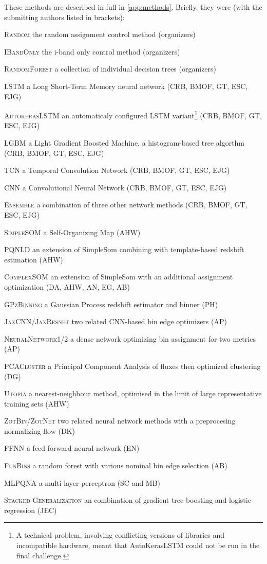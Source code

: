\documentclass[twocolumn,twocolappendix]{aastex63}
\begin{document}
These methods are described in full in \autoref{app:methods}.  Briefly, they were (with the submitting authors listed in brackets):
\begin{description*}
	\item[\textsc{Random}] the random assignment control method (organizers)
	\item[\textsc{IBandOnly}] the i-band only control method (organizers)
	\item[\textsc{RandomForest}] a collection of individual decision trees (organizers)
	\item[\textsc{LSTM}] a Long Short-Term Memory neural network (CRB, BMOF, GT, ESC, EJG)
	\item[\textsc{AutokerasLSTM}] an automaticaly configured LSTM variant\footnote{A technical problem, involving conflicting versions of libraries and incompatible hardware, meant that AutoKerasLSTM could not be run in the final challenge.} (CRB, BMOF, GT, ESC, EJG)
	\item[\textsc{LGBM}] a Light Gradient Boosted Machine, a histogram-based tree algorthm (CRB, BMOF, GT, ESC, EJG)
	\item[\textsc{TCN}] a Temporal Convolution Network (CRB, BMOF, GT, ESC, EJG)
	\item[\textsc{CNN}] a Convolutional Neural Network (CRB, BMOF, GT, ESC, EJG)
	\item[\textsc{Ensemble}] a combination of three other network methods (CRB, BMOF, GT, ESC, EJG)
	\item[\textsc{SimpleSOM}] a Self-Organizing Map (AHW)
	\item[\textsc{PQNLD}] an extension of {\sc SimpleSom} combining with template-based redshift estimation (AHW)
	\item[\textsc{ComplexSOM}] an extension of {\sc SimpleSom} with an additional assignment optimization (DA, AHW, AN, EG, AB)
	\item[\textsc{GPzBinning}] a Gaussian Process redshift estimator and binner (PH)
	\item[\textsc{JaxCNN/JaxResnet}] two related CNN-based bin edge optimizers (AP)
	\item[\textsc{NeuralNetwork1/2}] a dense network optimizing bin assignment for two metrics (AP)
	\item[\textsc{PCACluster}] a Principal Component Analysis of fluxes then optimized clustering (DG)
	\item[\textsc{Utopia}] a nearest-neighbour method, optimised in the limit of large representative training sets (AHW)
	\item[\textsc{ZotBin/ZotNet}] two related neural network methods with a preprocesing normalizing flow (DK)
	\item[\textsc{FFNN}] a feed-forward neural network (EN)
	\item[\textsc{FunBins}] a random forest with various nominal bin edge selection (AB)
	\item[\textsc{MLPQNA}] a multi-layer perceptron (SC and MB)
	\item[\textsc{Stacked Generalization}] an combination of gradient tree boosting and logistic regression (JEC)
\end{description*}
\end{document}
